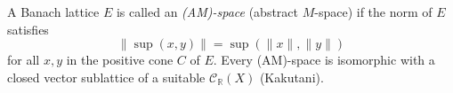 A Banach lattice $E$ is called an \emph{(AM)-space} (abstract $M$-space) if the norm of $E$ satisfies
$$
\|\sup(x, y)\| = \sup(\|x\|, \|y\|)
$$
for all $x, y$ in the positive cone $C$ of $E$. Every (AM)-space is isomorphic with a closed vector sublattice of a suitable $\mathcal{C}_{\mathbb{R}}(X)$ (Kakutani).
